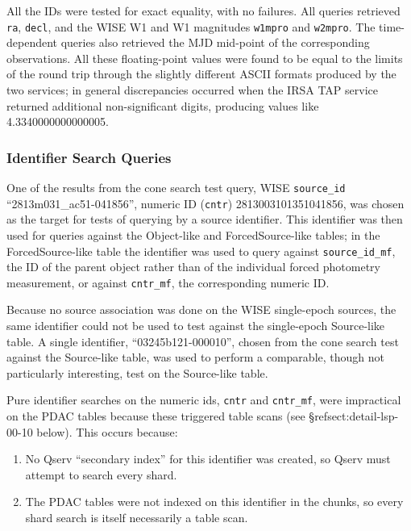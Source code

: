 \documentclass[DM,lsstdraft,STR,toc]{lsstdoc}
\begin{document}
All the IDs were tested for exact equality, with no failures.
All queries retrieved \verb|ra|, \verb|decl|, and the WISE W1 and W1 magnitudes \verb|w1mpro| and \verb|w2mpro|.
The time-dependent queries also retrieved the MJD mid-point of the corresponding observations.
All these floating-point values were found to be equal to the limits of the round trip through the slightly different ASCII formats produced by the two services;
in general discrepancies occurred when the IRSA TAP service returned additional non-significant digits,
producing values like 4.3340000000000005.

\subsubsection{Identifier Search Queries}

One of the results from the cone search test query, WISE \verb|source_id| ``2813m031\_ac51-041856'',
numeric ID (\verb|cntr|) 2813003101351041856,
was chosen as the target for tests of querying by a source identifier.
This identifier was then used for queries against the Object-like and ForcedSource-like tables;
in the ForcedSource-like table the identifier was used to query against \verb|source_id_mf|,
the ID of the parent object rather than of the individual forced photometry measurement,
or against \verb|cntr_mf|, the corresponding numeric ID.

Because no source association was done on the WISE single-epoch sources,
the same identifier could not be used to test against the single-epoch Source-like table.
A single identifier, ``03245b121-000010'', chosen from the cone search test against the Source-like table,
was used to perform a comparable, though not particularly interesting, test on the Source-like table.

Pure identifier searches on the numeric ids, \verb|cntr| and \verb|cntr_mf|,
were impractical on the PDAC tables because these triggered table scans (see \S ref{sect:detail-lsp-00-10} below).
This occurs because:

\begin{enumerate}
\item{No Qserv ``secondary index'' for this identifier was created, so Qserv must attempt to search every shard.}
\item{The PDAC tables were not indexed on this identifier in the chunks, so every shard search is itself necessarily a table scan.}
\end{enumerate}
\end{document}
